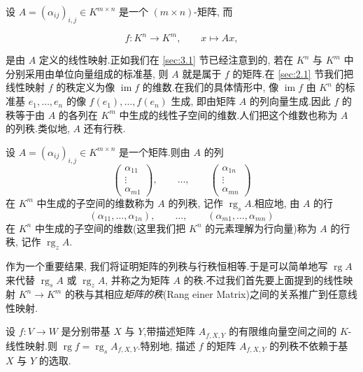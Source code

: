 设 $A = (\alpha_{ij})_{i, j} \in K^{m \times n}$ 是一个 $(m \times n)$-矩阵, 而

\[
f \colon K^n \longrightarrow K^m, \qquad x \longmapsto Ax,
\]

是由 $A$ 定义的线性映射.正如我们在 \ref{sec:3.1} 节已经注意到的, 若在 $K^n$ 与 $K^m$ 中分别采用由单位向量组成的标准基, 则 $A$ 就是属于 $f$ 的矩阵.在 \ref{sec:2.1} 节我们把线性映射 $f$ 的秩定义为像 $\operatorname{im} f$ 的维数.在我们的具体情形中, 像 $\operatorname{im} f$ 由 $K^n$ 的标准基 $e_1, \ldots, e_n$ 的像 $f(e_1), \ldots, f(e_n)$ 生成, 即由矩阵 $A$ 的列向量生成.因此 $f$ 的秩等于由 $A$ 的各列在 $K^m$ 中生成的线性子空间的维数.人们把这个维数也称为 $A$ 的列秩.类似地, $A$ 还有行秩.

\begin{definition}[列秩与行秩]\label{def:3.2.1}
设 $A = (\alpha_{ij})_{i, j} \in K^{m \times n}$ 是一个矩阵.则由 $A$ 的列
\[
\begin{pmatrix} \alpha_{11} \\ \vdots \\ \alpha_{m1} \end{pmatrix}, \qquad
\ldots, \qquad
\begin{pmatrix} \alpha_{1n} \\ \vdots \\ \alpha_{mn} \end{pmatrix}
\]
在 $K^m$ 中生成的子空间的维数称为 $A$ 的列秩, 记作 $\operatorname{rg}_s A$.相应地, 由 $A$ 的行
\[
(\alpha_{11}, \ldots, \alpha_{1n}), \qquad \ldots, \qquad (\alpha_{m1}, \ldots, \alpha_{mn})
\]
在 $K^n$ 中生成的子空间的维数(这里我们把 $K^n$ 的元素理解为行向量)称为 $A$ 的行秩, 记作 $\operatorname{rg}_z A$.
\end{definition}

作为一个重要结果, 我们将证明矩阵的列秩与行秩恒相等.于是可以简单地写 $\operatorname{rg} A$ 来代替 $\operatorname{rg}_s A$ 或 $\operatorname{rg}_z A$, 并称之为矩阵 $A$ 的秩.不过我们首先要上面提到的线性映射 $K^n \longrightarrow K^m$ 的秩与其相应\emph{矩阵的秩}(\textup{Rang einer Matrix})之间的关系推广到任意线性映射.

\begin{remark}\label{rem:3.2.2}
设 $f \colon V \longrightarrow W$ 是分别带基 $X$ 与 $Y$,带描述矩阵 $A_{f, X, Y}$ 的有限维向量空间之间的 $K$-线性映射.则 $\operatorname{rg} f = \operatorname{rg}_s A_{f, X, Y}$.特别地, 描述 $f$ 的矩阵 $A_{f, X, Y}$ 的列秩不依赖于基 $X$ 与 $Y$ 的选取.
\end{remark}


